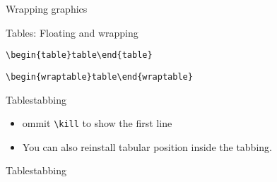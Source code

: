 \begin{frame}[fragile]{Wrapping graphics}\relax
    \cprotect{}

\end{frame}

\begin{frame}[fragile]{Tables: Floating and wrapping}\relax

\verb|\begin{table}table\end{table}|

\verb|\begin{wraptable}table\end{wraptable}|

\end{frame}

\begin{frame}[fragile]{Tables}{tabbing}\relax
    \cprotect{}
     \pause
     \begin{itemize}
         \item ommit \verb|\kill| to show the first line
         \item You can also reinstall tabular position inside the tabbing.
     \end{itemize}
\end{frame}

\begin{frame}[fragile]{Tables}{tabbing}\relax
    \cprotect{}
\end{frame}

